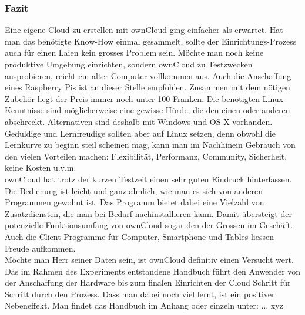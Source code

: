 \subsubsection{Fazit}
Eine eigene Cloud zu erstellen mit ownCloud ging einfacher als erwartet. Hat man das benötigte Know-How einmal gesammelt, sollte der Einrichtungs-Prozess auch für einen Laien kein grosses Problem sein. Möchte man noch keine produktive Umgebung einrichten, sondern ownCloud zu Testzwecken ausprobieren, reicht ein alter Computer vollkommen aus. Auch die Anschaffung eines Raspberry Pis ist an dieser Stelle empfohlen. Zusammen mit dem nötigen Zubehör liegt der Preis immer noch unter 100 Franken. Die benötigten Linux-Kenntnisse sind möglicherweise eine gewisse Hürde, die den einen oder anderen abschreckt. Alternativen sind deshalb mit Windows und OS X vorhanden. Geduldige und Lernfreudige sollten aber auf Linux setzen, denn obwohl die Lernkurve zu beginn steil scheinen mag, kann man im Nachhinein Gebrauch von den vielen Vorteilen machen: Flexibilität, Performanz, Community, Sicherheit, keine Kosten u.v.m.
\\
ownCloud hat trotz der kurzen Testzeit einen sehr guten Eindruck hinterlassen. Die Bedienung ist leicht und ganz ähnlich, wie man es sich von anderen Programmen gewohnt ist. Das Programm bietet dabei eine Vielzahl von Zusatzdiensten, die man bei Bedarf nachinstallieren kann. Damit übersteigt der potenzielle Funktionsumfang von ownCloud sogar den der Grossen im Geschäft. Auch die Client-Programme für Computer, Smartphone und Tables liessen Freude aufkommen.
\\
Möchte man Herr seiner Daten sein, ist ownCloud definitiv einen Versucht wert. Das im Rahmen des Experiments entstandene Handbuch führt den Anwender von der Anschaffung der Hardware bis zum finalen Einrichten der Cloud Schritt für Schritt durch den Prozess. Dass man dabei noch viel lernt, ist ein positiver Nebeneffekt.
Man findet das Handbuch im Anhang oder einzeln unter: ... xyz


